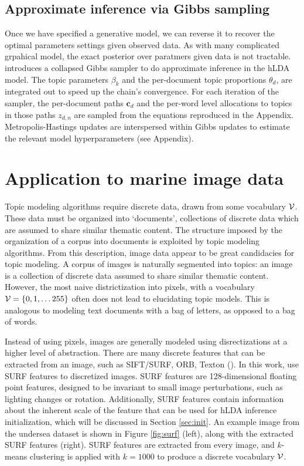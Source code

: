 \documentclass{article}
\begin{document}
\subsection{Approximate inference via Gibbs sampling}
Once we have specified a generative model, we can reverse it to recover the optimal parameters settings given observed data. As with many complicated grpahical model, the exact posterior over paratmers given data is not tractable. \cite{Blei2010} introduces a collapsed Gibbs sampler to do approximate inference in the hLDA model. The topic parameters $\beta_k$ and the per-document topic proportions $\theta_d$, are integrated out to speed up the chain's convergence. For each iteration of the sampler, the per-document paths $\mathbf{c}_d$ and the per-word level allocations to topics in those paths $z_{d,n}$ are sampled from the equations reproduced in the Appendix.  Metropolis-Hastings updates are interspersed within Gibbs updates to estimate the relevant model hyperparameters (see Appendix).

\section{Application to marine image data}
Topic modeling algorithms require discrete data, drawn from some vocabulary $\cal V$. These data must be organized into  `documents', collections of discrete data which are assumed to share similar thematic content. The structure imposed by the organization of a corpus into documents is exploited by topic modeling algorithms. From this description, image data appear to be great candidacies for topic modeling. A corpus of images is naturally segmented into topics: an image is a collection of discrete data assumed to share similar thematic content. However, the most naive districtization into pixels, with a vocabulary $\cal V = \{\text{0}, \text{1}, \dots \text{255} \}$ often does not lead to elucidating topic models. This is analogous to modeling text documents with a bag of letters, as opposed to a bag of words.

Instead of using pixels, images are generally modeled using disrectizations at a higher level of abstraction. There are many discrete features that can be extracted from an image, such as SIFT/SURF, ORB, Texton (\cite{Bay:ECCV:2006, RubleeE2011}). In this work, use SURF features to discretized images. SURF features are 128-dimensional floating point features, designed to be invariant to small image perturbations, such as lighting changes or rotation.  Additionally, SURF features contain information about the inherent scale of the feature that can be used for hLDA inference initialization, which will be discussed in Section \ref{sec:init}. An example image from the undersea dataset is shown in Figure \ref{fig:surf} (left), along with the extracted SURF features (right). SURF features are extracted from every image, and $k$-means clustering is applied with $k = 1000$ to produce a discrete vocabulary $\cal V$.
\end{document}
